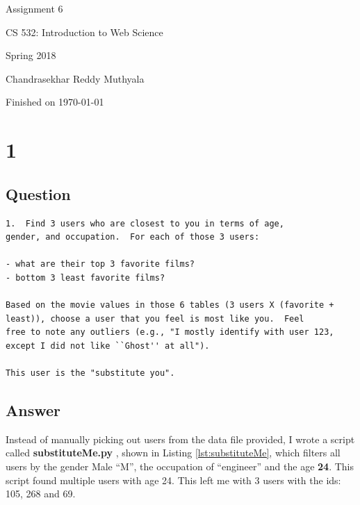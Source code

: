 \documentclass[letterpaper,11pt]{article}
\begin{document}
\begin{titlepage}

\begin{center}

\Huge{Assignment 6}

\Large{CS 532:  Introduction to Web Science}

\Large{Spring 2018}

\Large{Chandrasekhar Reddy Muthyala}

\Large Finished on \today

\end{center}

\end{titlepage}

\newpage


\section*{1}

\subsection*{Question}

\begin{verbatim}
1.  Find 3 users who are closest to you in terms of age, 
gender, and occupation.  For each of those 3 users:

- what are their top 3 favorite films?
- bottom 3 least favorite films?

Based on the movie values in those 6 tables (3 users X (favorite +
least)), choose a user that you feel is most like you.  Feel 
free to note any outliers (e.g., "I mostly identify with user 123,
except I did not like ``Ghost'' at all").  

This user is the "substitute you".
\end{verbatim}

\clearpage
\subsection*{Answer}

Instead of manually picking out users from the data file provided, I wrote a script called \textbf{substituteMe.py} , shown in Listing \ref{lst:substituteMe}, which filters all users by the gender Male ``M'', the occupation of ``engineer'' and the age \textbf{24}. This script found multiple users with age 24. This left me with 3 users with the ids: 105, 268 and 69. 
\end{document}
